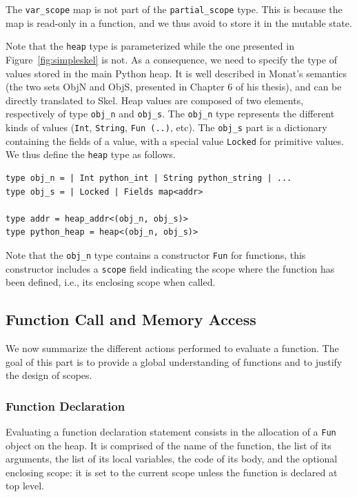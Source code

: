 \documentclass[submission,copyright,creativecommons]{eptcs}
\newcommand{\skinl}[1]{\texttt{#1}}
\begin{document}
The \skinl{var_scope} map is not part of the \skinl{partial_scope} type.
This is because the map is read-only in a function, and we thus avoid to store it in the mutable state.

Note that the \texttt{heap} type is parameterized while the one presented in Figure~\ref{fig:simpleskel} is not.
As a consequence, we need to specify the type of values stored in the main Python heap.
It is well described in Monat's semantics (the two sets \textsf{ObjN} and
\textsf{ObjS}, presented in Chapter 6 of his thesis), and can be directly translated to Skel.
Heap values are composed of two elements, respectively of type \texttt{obj_n} and \texttt{obj_s}.
The \texttt{obj_n} type represents the different kinds of values (\texttt{Int}, \texttt{String}, \texttt{Fun (..)}, etc).
The \texttt{obj_s} part is a dictionary containing the fields of a value, with a
special value \skinl{Locked} for primitive values.
We thus define the \texttt{heap} type as follows.
\begin{verbatim}
type obj_n = | Int python_int | String python_string | ...
type obj_s = | Locked | Fields map<addr>

type addr = heap_addr<(obj_n, obj_s)>
type python_heap = heap<(obj_n, obj_s)>
\end{verbatim}
Note that the \texttt{obj_n} type contains a constructor \skinl{Fun} for functions, this
constructor includes a \texttt{scope} field indicating the scope where the
function has been defined, i.e., its enclosing scope when called.

\subsection{Function Call and Memory Access}
We now summarize the different actions performed to evaluate a function.
The goal of this part is to provide a global understanding of functions and to justify the design of scopes.

\subsubsection{Function Declaration}
Evaluating a function declaration statement consists in the allocation of a
\skinl{Fun} object on the heap. It is comprised of the name of the function, the
list of its arguments, the list of its local variables, the code of its body, and
the optional enclosing scope: it is set to the current scope unless the function
is declared at top level.
\end{document}
